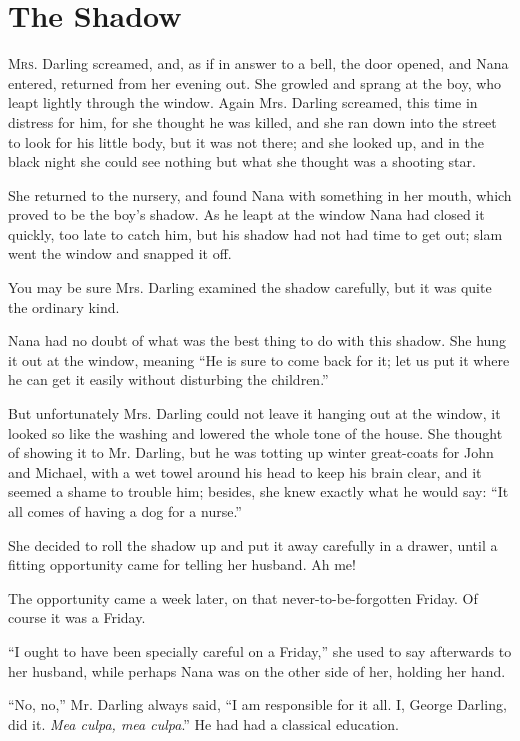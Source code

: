\chapter{The Shadow}

\lettrine{M}{rs.} Darling screamed, and, as if in answer to a bell, the door
opened, and Nana entered, returned from her evening out.
She growled and sprang at the boy, who leapt lightly through the window.
Again Mrs. Darling screamed, this time in distress for him, for she thought he
was killed, and she ran down into the street to look for his little body, but it
was not there; and she looked up, and in the black night she could see nothing
but what she thought was a shooting star.

She returned to the nursery, and found Nana with something in her mouth, which
proved to be the boy's shadow.
As he leapt at the window Nana had closed it quickly, too late to catch him, but
his shadow had not had time to get out; slam went the window and snapped it off.

You may be sure Mrs. Darling examined the shadow carefully, but it was quite the
ordinary kind.

Nana had no doubt of what was the best thing to do with this shadow.
She hung it out at the window, meaning ``He is sure to come back for it; let us
put it where he can get it easily without disturbing the children.''

But unfortunately Mrs. Darling could not leave it hanging out at the window, it
looked so like the washing and lowered the whole tone of the house.
She thought of showing it to Mr. Darling, but he was totting up winter
great-coats for John and Michael, with a wet towel around his head to keep his
brain clear, and it seemed a shame to trouble him; besides, she knew exactly
what he would say: ``It all comes of having a dog for a nurse.''

She decided to roll the shadow up and put it away carefully in a drawer, until a
fitting opportunity came for telling her husband.
Ah me!

The opportunity came a week later, on that never-to-be-forgotten Friday.
Of course it was a Friday.

``I ought to have been specially careful on a Friday,'' she used to say
afterwards to her husband, while perhaps Nana was on the other side of her,
holding her hand.

``No, no,'' Mr. Darling always said, ``I am responsible for it all.
I, George Darling, did it.
\emph{Mea culpa, mea culpa}.''
He had had a classical education.

